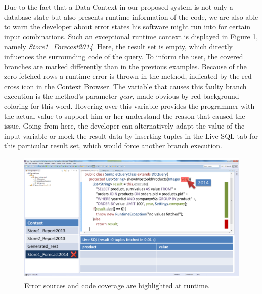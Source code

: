 Due to the fact that a Data Context in our proposed system is not only a database state but also presents runtime information of the code, we are also able to warn the developer about error states his software might run into for certain input combinations. Such an exceptional runtime context is displayed in Figure \ref{fig:final_prototype_error}, namely \emph{Store1\_Forecast2014}. Here, the result set is empty, which directly influences the surrounding code of the query. To inform the user, the covered branches are marked differently than in the previous examples. Because of the zero fetched rows a runtime error is thrown in the method, indicated by the red cross icon in the Context Browser. The variable that causes this faulty branch execution is the method's parameter \emph{year}, made obvious by red background coloring for this word. Hovering over this variable provides the programmer with the actual value to support him or her understand the reason that caused the issue. Going from here, the developer can alternatively adapt the value of the input variable or mock the result data by inserting tuples in the Live-SQL tab for this particular result set, which would force another branch execution.\\
\begin{figure}
\begin{centering}
    \includegraphics[width=1.0\linewidth]{images/error}
    \caption{Error sources and code coverage are highlighted at runtime.}
    \label{fig:final_prototype_error}
\end{centering}
\end{figure}